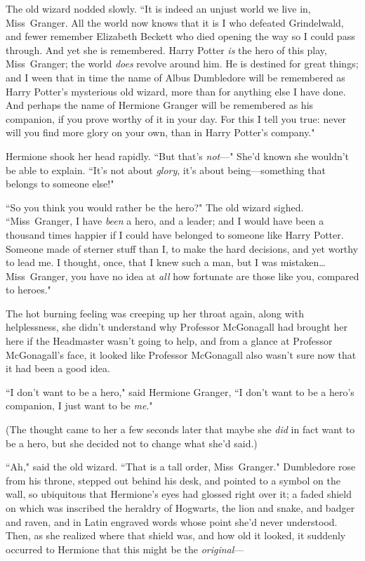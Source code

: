 The old wizard nodded slowly. ``It is indeed an unjust world we live in, Miss~Granger. All the world now knows that it is I who defeated Grindelwald, and fewer remember Elizabeth Beckett who died opening the way so I could pass through. And yet she is remembered. Harry Potter \emph{is} the hero of this play, Miss~Granger; the world \emph{does} revolve around him. He is destined for great things; and I ween that in time the name of Albus Dumbledore will be remembered as Harry Potter's mysterious old wizard, more than for anything else I have done. And perhaps the name of Hermione Granger will be remembered as his companion, if you prove worthy of it in your day. For this I tell you true: never will you find more glory on your own, than in Harry Potter's company."

Hermione shook her head rapidly. ``But that's \emph{not}---" She'd known she wouldn't be able to explain. ``It's not about \emph{glory}, it's about being---something that belongs to someone else!"

``So you think you would rather be the hero?" The old wizard sighed. ``Miss~Granger, I have \emph{been} a hero, and a leader; and I would have been a thousand times happier if I could have belonged to someone like Harry Potter. Someone made of sterner stuff than I, to make the hard decisions, and yet worthy to lead me. I thought, once, that I knew such a man, but I was mistaken{\ldots} Miss~Granger, you have no idea at \emph{all} how fortunate are those like you, compared to heroes."

The hot burning feeling was creeping up her throat again, along with helplessness, she didn't understand why Professor McGonagall had brought her here if the Headmaster wasn't going to help, and from a glance at Professor McGonagall's face, it looked like Professor McGonagall also wasn't sure now that it had been a good idea.

``I don't want to be a hero," said Hermione Granger, ``I don't want to be a hero's companion, I just want to be \emph{me}."

(The thought came to her a few seconds later that maybe she \emph{did} in fact want to be a hero, but she decided not to change what she'd said.)

``Ah," said the old wizard. ``That is a tall order, Miss~Granger." Dumbledore rose from his throne, stepped out behind his desk, and pointed to a symbol on the wall, so ubiquitous that Hermione's eyes had glossed right over it; a faded shield on which was inscribed the heraldry of Hogwarts, the lion and snake, and badger and raven, and in Latin engraved words whose point she'd never understood. Then, as she realized where that shield was, and how old it looked, it suddenly occurred to Hermione that this might be the \emph{original}---

